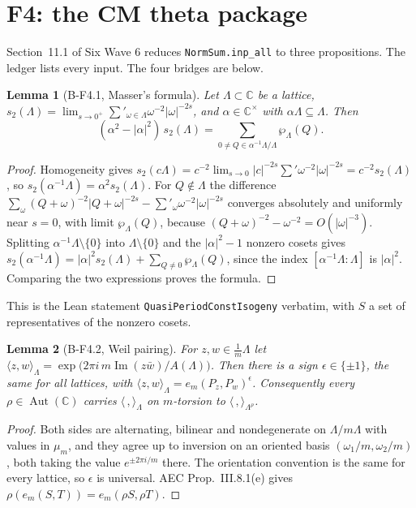 \documentclass[11pt]{article}
\newcommand{\lean}[1]{\nolinkurl{#1}}
\newtheorem{lemma}{Lemma}
\theoremstyle{definition}
\begin{document}
\section{F4: the CM theta package}\label{sec:f4}

Section~11.1 of Six Wave 6 reduces \lean{NormSum.inp_all} to three propositions. The ledger lists every input. The four bridges are below.

\begin{lemma}[B-F4.1, Masser's formula]
Let $\Lambda\subset\mathbb C$ be a lattice, $s_2(\Lambda)=\lim_{s\to0^+}\sum'_{\omega\in\Lambda}\omega^{-2}\lvert\omega\rvert^{-2s}$, and $\alpha\in\mathbb C^\times$ with $\alpha\Lambda\subseteq\Lambda$. Then
\[
(\alpha^2-\lvert\alpha\rvert^2)\,s_2(\Lambda)=\sum_{0\ne Q\in\alpha^{-1}\Lambda/\Lambda}\wp_\Lambda(Q).
\]
\end{lemma}
\begin{proof}
Homogeneity gives $s_2(c\Lambda)=c^{-2}\lim_{s\to0}\lvert c\rvert^{-2s}\sum'\omega^{-2}\lvert\omega\rvert^{-2s}=c^{-2}s_2(\Lambda)$, so $s_2(\alpha^{-1}\Lambda)=\alpha^2s_2(\Lambda)$. For $Q\notin\Lambda$ the difference $\sum_{\omega}(Q+\omega)^{-2}\lvert Q+\omega\rvert^{-2s}-\sum'_\omega\omega^{-2}\lvert\omega\rvert^{-2s}$ converges absolutely and uniformly near $s=0$, with limit $\wp_\Lambda(Q)$, because $(Q+\omega)^{-2}-\omega^{-2}=O(\lvert\omega\rvert^{-3})$. Splitting $\alpha^{-1}\Lambda\setminus\{0\}$ into $\Lambda\setminus\{0\}$ and the $\lvert\alpha\rvert^2-1$ nonzero cosets gives $s_2(\alpha^{-1}\Lambda)=\lvert\alpha\rvert^2s_2(\Lambda)+\sum_{Q\ne0}\wp_\Lambda(Q)$, since the index $[\alpha^{-1}\Lambda:\Lambda]$ is $\lvert\alpha\rvert^2$. Comparing the two expressions proves the formula.
\end{proof}

This is the Lean statement \lean{QuasiPeriodConstIsogeny} verbatim, with $S$ a set of representatives of the nonzero cosets.

\begin{lemma}[B-F4.2, Weil pairing]
For $z,w\in\frac1m\Lambda$ let $\langle z,w\rangle_\Lambda=\exp\bigl(2\pi i\,m\operatorname{Im}(z\bar w)/A(\Lambda)\bigr)$. Then there is a sign $\epsilon\in\{\pm1\}$, the same for all lattices, with $\langle z,w\rangle_\Lambda=e_m(P_z,P_w)^\epsilon$. Consequently every $\rho\in\operatorname{Aut}(\mathbb C)$ carries $\langle\,,\rangle_\Lambda$ on $m$-torsion to $\langle\,,\rangle_{\Lambda^\rho}$.
\end{lemma}
\begin{proof}
Both sides are alternating, bilinear and nondegenerate on $\Lambda/m\Lambda$ with values in $\mu_m$, and they agree up to inversion on an oriented basis $(\omega_1/m,\omega_2/m)$, both taking the value $e^{\pm2\pi i/m}$ there. The orientation convention is the same for every lattice, so $\epsilon$ is universal. AEC Prop.~III.8.1(e) gives $\rho(e_m(S,T))=e_m(\rho S,\rho T)$.
\end{proof}
\end{document}
